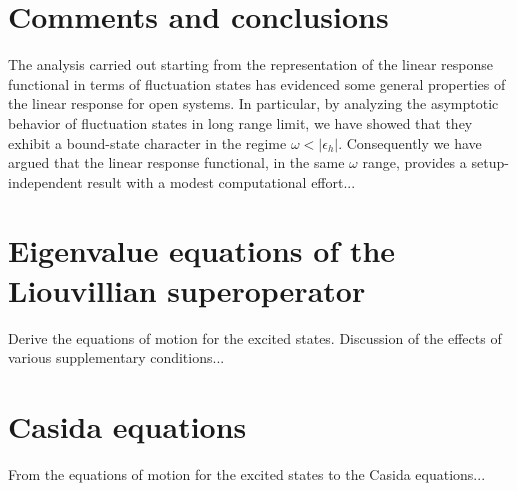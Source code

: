 \documentclass[reprint,aps,prb]{revtex4-1}
\newcommand{\eps}{\epsilon}
\begin{document}
\section{Comments and conclusions}

The analysis carried out starting from the representation of the linear response functional in terms of fluctuation states has evidenced some general properties of the linear response
for open systems. In particular, by analyzing the asymptotic behavior of fluctuation states in long range limit, we have showed that they exhibit a bound-state character in the regime  
$\omega<|\eps_h|$. Consequently we have argued that the linear response functional, in the same $\omega$ range, provides a setup-independent result with a modest computational effort... 

\appendix
\section{Eigenvalue equations of the Liouvillian superoperator}

Derive the equations of motion for the excited states. Discussion of the effects of various supplementary conditions...

\section{Casida equations}

From the equations of motion for the excited states to the Casida equations...


%

\end{document}

